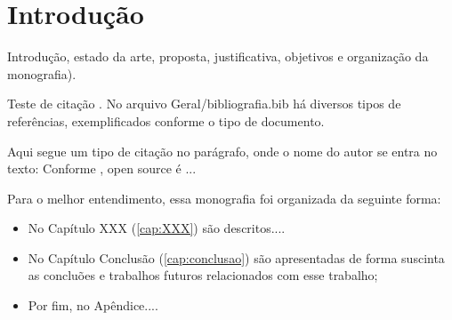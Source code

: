 \chapter{Introdução}
\label{cap:introducao}

Introdução, estado da arte, proposta, justificativa, objetivos e organização da monografia).

Teste de citação \cite{Weka2014}. No arquivo Geral/bibliografia.bib há diversos tipos de referências, exemplificados conforme o tipo de documento.

Aqui segue um tipo de citação no parágrafo, onde o nome do autor se entra no texto: Conforme , open source é ...


Para o melhor entendimento, essa monografia foi organizada da seguinte forma:

\begin{itemize}
\item No Capítulo XXX (\ref{cap:XXX}) são descritos....

\item No Capítulo Conclusão (\ref{cap:conclusao}) são apresentadas de forma suscinta as concluões e trabalhos futuros relacionados com esse trabalho;

\item Por fim, no Apêndice....
\end{itemize}


